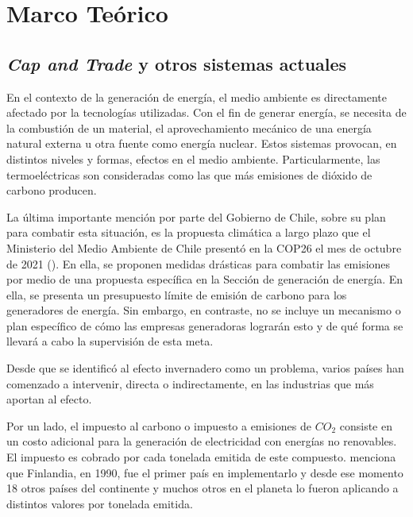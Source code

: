 
\chapter{Marco Teórico}
\label{c2} 


\section{\textit{Cap and Trade} y otros sistemas actuales}\label{c22}

En el contexto de la generación de energía, el medio ambiente es directamente afectado por la tecnologías utilizadas. Con el fin de generar energía, se necesita de la combustión de un material, el aprovechamiento mecánico de una energía natural externa u otra fuente como energía nuclear. Estos sistemas provocan, en distintos niveles y formas, efectos en el medio ambiente. Particularmente, las termoeléctricas son consideradas como las que más emisiones de dióxido de carbono producen.
\vspace{2.5mm}

La última importante mención por parte del Gobierno de Chile, sobre su plan para combatir esta situación, es la propuesta climática a largo plazo que el Ministerio del Medio Ambiente de Chile presentó en la COP26 el mes de octubre de 2021 (). En ella, se proponen medidas drásticas para combatir las emisiones por medio de una propuesta específica en la Sección de generación de energía. En ella, se presenta un presupuesto límite de emisión de carbono para los generadores de energía. Sin  embargo, en contraste, no se incluye un mecanismo o plan específico de cómo las empresas generadoras lograrán esto y de qué forma se llevará a cabo la supervisión de esta meta.
\vspace{2.5mm}

Desde que se identificó al efecto invernadero como un problema, varios países han comenzado a intervenir, directa o indirectamente, en las industrias que más aportan al efecto. 
\vspace{2.5mm}

Por un lado, el impuesto al carbono o impuesto a emisiones de $CO_2$ consiste en un costo adicional para la generación de electricidad con energías no renovables. El impuesto es cobrado por cada tonelada emitida de este compuesto.  menciona que Finlandia, en 1990, fue el primer país en implementarlo y desde ese momento 18 otros países del continente y muchos otros en el planeta lo fueron aplicando a distintos valores por tonelada emitida.
\vspace{2.5mm}

